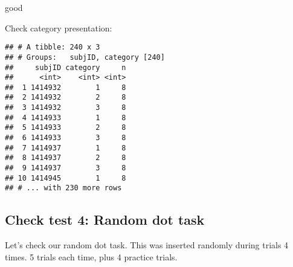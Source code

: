 \documentclass[
]{article}
\newenvironment{Shaded}{\begin{snugshade}}{\end{snugshade}}
\newcommand{\DataTypeTok}[1]{\textcolor[rgb]{0.13,0.29,0.53}{#1}}
\newcommand{\KeywordTok}[1]{\textcolor[rgb]{0.13,0.29,0.53}{\textbf{#1}}}
\newcommand{\NormalTok}[1]{#1}
\newcommand{\OperatorTok}[1]{\textcolor[rgb]{0.81,0.36,0.00}{\textbf{#1}}}
\newcommand{\OtherTok}[1]{\textcolor[rgb]{0.56,0.35,0.01}{#1}}
\newcommand{\StringTok}[1]{\textcolor[rgb]{0.31,0.60,0.02}{#1}}
\begin{document}
good

\begin{Shaded}
\end{Shaded}

Check category presentation:

\begin{Shaded}
\end{Shaded}

\begin{verbatim}
## # A tibble: 240 x 3
## # Groups:   subjID, category [240]
##     subjID category     n
##      <int>    <int> <int>
##  1 1414932        1     8
##  2 1414932        2     8
##  3 1414932        3     8
##  4 1414933        1     8
##  5 1414933        2     8
##  6 1414933        3     8
##  7 1414937        1     8
##  8 1414937        2     8
##  9 1414937        3     8
## 10 1414945        1     8
## # ... with 230 more rows
\end{verbatim}

\hypertarget{check-test-4-random-dot-task}{%
\subsection{Check test 4: Random dot
task}\label{check-test-4-random-dot-task}}

Let's check our random dot task. This was inserted randomly during
trials 4 times. 5 trials each time, plus 4 practice trials.

\begin{Shaded}
\end{Shaded}
\end{document}
